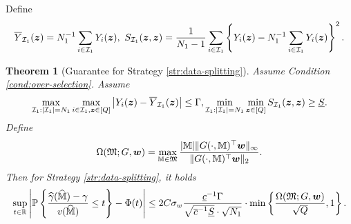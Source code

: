 \documentclass[12pt]{article}
\newtheorem{theorem}{Theorem}
\begin{document}
Define
\begin{gather*}
    \overline{Y}_{{\mathcal{I}}_1}({\boldsymbol{z}}) = N_1^{-1}\sum_{i\in{\mathcal{I}}_1}Y_i({\boldsymbol{z}}),~ S_{{\mathcal{I}}_1}({\boldsymbol{z}},{\boldsymbol{z}}) =\frac{1}{N_1 - 1}\sum_{i\in{\mathcal{I}}_1} \left\{Y_i({\boldsymbol{z}}) - N_1^{-1}\sum_{i\in{\mathcal{I}}_1}Y_i({\boldsymbol{z}})\right\}^2.
\end{gather*}
\begin{theorem}[Guarantee for Strategy \ref{str:data-splitting}]%
Assume Condition \ref{cond:over-selection}. Assume 
\begin{gather}%
    \max_{\cI_1:|\cI_1| = N_1}\max_{i\in\cI_1, \bz\in [Q]} \lt|Y_i(\bz) - \overline{Y}_{\cI_1}(\bz) \rt| \le \Gamma, 
    \min_{\cI_1:|\cI_1| = N_1}\min_{\bz\in [Q]} S_{\cI_1}(\bz,\bz) \ge \underline{S}.
\end{gather}
Define
\begin{align}%
    \Omega(\mathfrak{M};G,\bw) = \max_{\bbM\in\mathfrak{M}} \frac{|\bbM|\| G(\cdot, \bbM)^\top \bw\|_\infty}{\| G(\cdot, \bbM)^\top \bw\|_2}.
\end{align}
Then for Strategy \ref{str:data-splitting}, it holds
\begin{align*}
    \sup_{t\in{\mathbb{R}}}\left|{{\mathbb{P}}\left\{\frac{{\widehat{\gamma}}(\widehat{{\mathbb{M}}}) - \gamma}{v(\widehat{{\mathbb{M}}})} \le t\right\}} - \Phi(t)\right| \le 2C\sigma_w   \frac{\underline{c}^{-1} \Gamma}{\sqrt{\overline{c}^{-1} \underline{S}}\cdot \sqrt{N_1}}\cdot \min\left\{\frac{\Omega(\mathfrak{M};G,{\boldsymbol{w}})}{\sqrt{Q} },1\right\}.
\end{align*}
\end{theorem}

\end{document}
